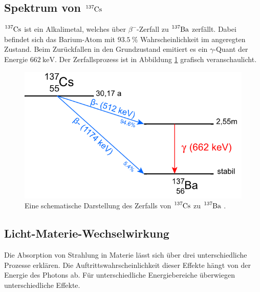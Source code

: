 \subsection{Spektrum von $\ce{^{137}Cs}$}

\noindent
$\ce{^{137}Cs}$ ist ein Alkalimetal, welches über $\beta^-$-Zerfall zu $\ce{^{137}Ba}$ zerfällt. 
Dabei befindet sich das Barium-Atom mit $\SI{93.5}{\percent}$ Wahrscheinlichkeit im angeregten Zustand. 
Beim Zurückfallen in den Grundzustand emitiert es ein $\gamma$-Quant der Energie $\SI{662}{\kilo\electronvolt}$.
Der Zerfallsprozess ist in Abbildung \ref{img:decay} grafisch veranschaulicht.


\begin{figure}[H]
    \centering
    \includegraphics[width=0.45 \textwidth]{latex/images/zerfall.PNG}
    \caption{Eine schematische Darstellung des Zerfalls von $\ce{^{137}Cs}$ zu $\ce{^{137}Ba}$ \protect \cite{leifi}.}
    \label{img:decay}
\end{figure}


\subsection{Licht-Materie-Wechselwirkung}

\noindent
Die Absorption von Strahlung in Materie lässt sich über drei unterschiedliche Prozesse erklären. 
Die Auftrittswahrscheinlichkeit dieser Effekte hängt von der Energie des Photons ab. 
Für unterschiedliche Energiebereiche überwiegen unterschiedliche Effekte.

